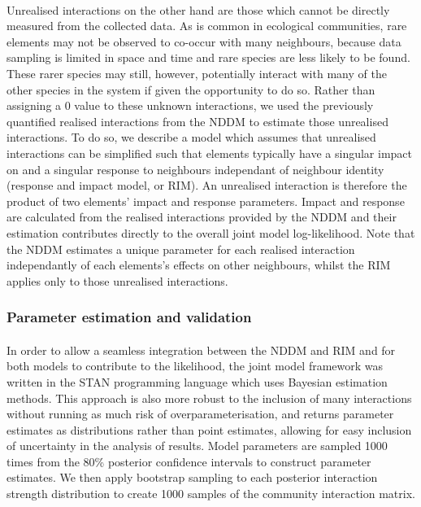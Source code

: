 \documentclass[a4,12pt]{article}
\begin{document}
    \paragraph{}
        Unrealised interactions on the other hand are those which cannot be directly measured from the collected data. As is common in ecological communities, rare elements may not be observed to co-occur with many neighbours, because data sampling is limited in space and time and rare species are less likely to be found. These rarer species may still, however, potentially interact with many of the other species in the system if given the opportunity to do so. Rather than assigning a 0 value to these unknown interactions, we used the previously quantified realised interactions from the NDDM to estimate those unrealised interactions. To do so, we describe a model which assumes that unrealised interactions can be simplified such that elements typically have a singular impact on and a singular response to neighbours independant of neighbour identity (response and impact model, or RIM). An unrealised interaction is therefore the product of two elements' impact and response parameters. Impact and response are calculated from the realised interactions provided by the NDDM and their estimation contributes directly to the overall joint model log-likelihood. Note that the NDDM estimates a unique parameter for each realised interaction independantly of each elements's effects on other neighbours, whilst the RIM applies only to those unrealised interactions. 


    \subsubsection*{Parameter estimation and validation}

        \paragraph{}
        In order to allow a seamless integration between the NDDM and RIM and for both models to contribute to the likelihood, the joint model framework was written in the STAN programming language which uses Bayesian estimation methods. This approach is also more robust to the inclusion of many interactions without running as much risk of overparameterisation, and returns parameter estimates as distributions rather than point estimates, allowing for easy inclusion of uncertainty in the analysis of results. Model parameters are sampled 1000 times from the 80\% posterior confidence intervals to construct parameter estimates. We then apply bootstrap sampling to each posterior interaction strength distribution to create 1000 samples of the community interaction matrix. 
\end{document}
